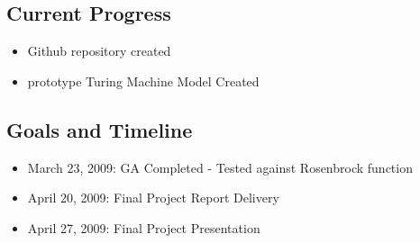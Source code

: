 \subsection{Current Progress} 
\begin{itemize}
	\item Github repository created
	\item prototype Turing Machine Model Created
\end{itemize}

\subsection{Goals and Timeline}
\begin{itemize}
	\item March 23, 2009: GA Completed - Tested against Rosenbrock function
	\item April 20, 2009: Final Project Report Delivery
	\item April 27, 2009: Final Project Presentation
\end{itemize}
